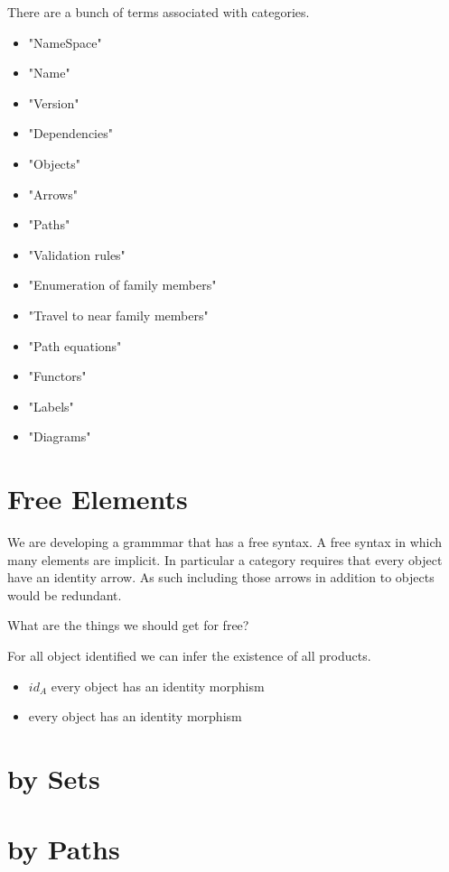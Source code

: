 \documentclass{article}
\begin{document}
There are a bunch of terms associated with categories.

\begin{itemize}
  \item "NameSpace"
  \item "Name"
  \item "Version"
  \item "Dependencies"
  \item "Objects"
  \item "Arrows"
  \item "Paths"
  \item "Validation rules"
  \item "Enumeration of family members"
  \item "Travel to near family members"
  \item "Path equations"
  \item "Functors"
  \item "Labels"
  \item "Diagrams"
\end{itemize}

\section{Free Elements}

We are developing a grammmar that has a free syntax.
A free syntax in which many elements are implicit.
In particular a category requires that every object have an identity arrow.
As such including those arrows in addition to objects would be redundant.

What are the things we should get for free?

For all object identified we can infer the existence of all products.



\begin{itemize}
  \item $id_A$ every object has an identity morphism
  \item every object has an identity morphism
\end{itemize}

\section{by Sets}


\section{by Paths}
\end{document}

